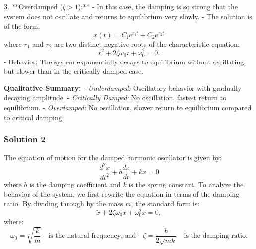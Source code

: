 \documentclass{article}
\begin{document}
3. **Overdamped (\( \zeta > 1 \)):**
   - In this case, the damping is so strong that the system does not oscillate and returns to equilibrium very slowly.
   - The solution is of the form:
     \[
     x(t) = C_1 e^{r_1 t} + C_2 e^{r_2 t}
     \]
     where \( r_1 \) and \( r_2 \) are two distinct negative roots of the characteristic equation:
     \[
     r^2 + 2\zeta\omega_0 r + \omega_0^2 = 0.
     \]
   - Behavior: The system exponentially decays to equilibrium without oscillating, but slower than in the critically damped case.

\textbf{Qualitative Summary:}
- \textit{Underdamped:} Oscillatory behavior with gradually decaying amplitude.
- \textit{Critically Damped:} No oscillation, fastest return to equilibrium.
- \textit{Overdamped:} No oscillation, slower return to equilibrium compared to critical damping.

\subsubsection{Solution 2}

The equation of motion for the damped harmonic oscillator is given by:
\[
\frac{d^2x}{dt^2} + b\frac{dx}{dt} + kx = 0
\]
where \( b \) is the damping coefficient and \( k \) is the spring constant. To analyze the behavior of the system, we first rewrite the equation in terms of the damping ratio. By dividing through by the mass \( m \), the standard form is:
\[
\ddot{x} + 2\zeta \omega_0 \dot{x} + \omega_0^2 x = 0,
\]
where:
\[
\omega_0 = \sqrt{\frac{k}{m}} \quad \text{is the natural frequency, and} \quad \zeta = \frac{b}{2\sqrt{mk}} \quad \text{is the damping ratio.}
\]
\end{document}
